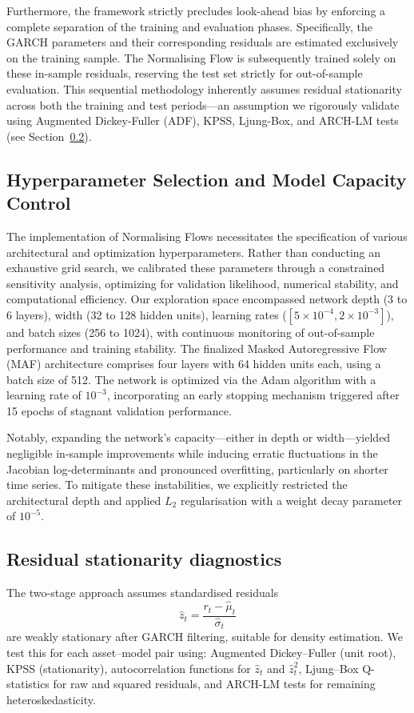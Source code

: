 \documentclass[risks,article,submit,pdftex,moreauthors]{Definitions/mdpi}
\begin{document}
Furthermore, the framework strictly precludes look-ahead bias by enforcing a complete separation of the training and evaluation phases. Specifically, the GARCH parameters and their corresponding residuals are estimated exclusively on the training sample. The Normalising Flow is subsequently trained solely on these in-sample residuals, reserving the test set strictly for out-of-sample evaluation. This sequential methodology inherently assumes residual stationarity across both the training and test periods—an assumption we rigorously validate using Augmented Dickey-Fuller (ADF), KPSS, Ljung-Box, and ARCH-LM tests (see Section~\ref{subsec:resid_stationarity}).

\subsection{Hyperparameter Selection and Model Capacity Control}
\label{subsec:hyperparams}


The implementation of Normalising Flows necessitates the specification of various architectural and optimization hyperparameters. Rather than conducting an exhaustive grid search, we calibrated these parameters through a constrained sensitivity analysis, optimizing for validation likelihood, numerical stability, and computational efficiency. Our exploration space encompassed network depth (3 to 6 layers), width (32 to 128 hidden units), learning rates ($[5 \times 10^{-4}, 2 \times 10^{-3}]$), and batch sizes (256 to 1024), with continuous monitoring of out-of-sample performance and training stability. The finalized Masked Autoregressive Flow (MAF) architecture comprises four layers with 64 hidden units each, using a batch size of 512. The network is optimized via the Adam algorithm with a learning rate of $10^{-3}$, incorporating an early stopping mechanism triggered after 15 epochs of stagnant validation performance. 

Notably, expanding the network's capacity—either in depth or width—yielded negligible in-sample improvements while inducing erratic fluctuations in the Jacobian log-determinants and pronounced overfitting, particularly on shorter time series. To mitigate these instabilities, we explicitly restricted the architectural depth and applied $L_2$ regularisation with a weight decay parameter of $10^{-5}$. 

\subsection{Residual stationarity diagnostics}
\label{subsec:resid_stationarity}
The two-stage approach assumes standardised residuals
\[
\hat{z}_t = \frac{r_t - \hat{\mu}_t}{\hat{\sigma}_t}
\]
are weakly stationary after GARCH filtering, suitable for density estimation. We test this for each asset--model pair using: Augmented Dickey--Fuller (unit root), KPSS (stationarity), autocorrelation functions for $\hat{z}_t$ and $\hat{z}_t^2$, Ljung--Box Q-statistics for raw and squared residuals, and ARCH-LM tests for remaining heteroskedasticity.
\end{document}

